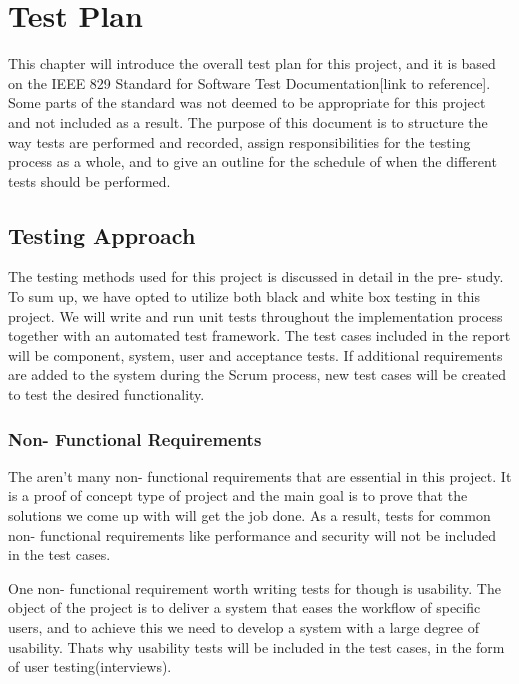 \chapter{Test Plan}

\minitoc

This chapter will introduce the overall test plan for this project, and it is based on the IEEE 829 Standard for Software Test Documentation[link to reference]. Some parts of the standard was not deemed to be appropriate for this project and not included as a result. The purpose of this document is to structure the way tests are performed and recorded, assign responsibilities for the testing process as a whole, and to give an outline for the schedule of when the different tests should be performed.

\clearpage

\section{Testing Approach}
The testing methods used for this project is discussed in detail in the pre- study. To sum up, we have opted to utilize both black and white box testing in this project. We will write and run unit tests throughout the implementation process together with an automated test framework. The test cases included in the report will be component, system, user and acceptance tests. If additional requirements are added to the system during the Scrum process, new test cases will be created to test the desired functionality.

\subsection{Non- Functional Requirements}
The aren't many non- functional requirements that are essential in this project. It is a proof of concept type of project and the main goal is to prove that the solutions we come up with will get the job done. As a result, tests for common non- functional requirements like performance and security will not be included in the test cases. 

One non- functional requirement worth writing tests for though is usability. The object of the project is to deliver a system that eases the workflow of specific users, and to achieve this we need to develop a system with a large degree of usability. Thats why usability tests will be included in the test cases, in the form of user testing(interviews).

